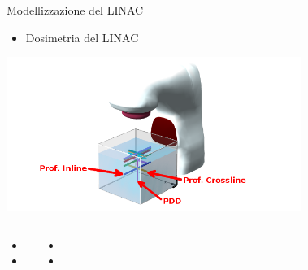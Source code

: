 \documentclass{beamer}
\begin{document}
\begin{frame}{Modellizzazione del LINAC}
\begin{itemize}
\scriptsize
{}
\item \alert{Dosimetria del LINAC}
\end{itemize}
\vspace{-.4cm}
\begin{center}
\includegraphics[height=5cm]{./img/Prof3D_ann.png}
\end{center}

\begin{columns}
\begin{itemize}
\footnotesize
\item {}
\item {}
\end{itemize}
\begin{itemize}
\footnotesize
\item {}
\item {}
\end{itemize}
\end{columns}
\end{frame}
\end{document}
